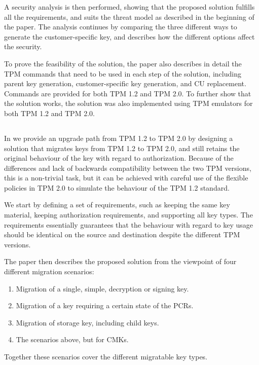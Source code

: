 A security analysis is then performed, showing that the proposed solution fulfills all the requirements, and suits the threat model as described in the beginning of the paper.
The analysis continues by comparing the three different ways to generate the customer-specific key, and describes how the different options affect the security.

To prove the feasibility of the solution, the paper also describes in detail the TPM commands that need to be used in each step of the solution, including parent key generation, customer-specific key generation, and CU replacement.
Commands are provided for both TPM 1.2 and TPM 2.0.
To further show that the solution works, the solution was also implemented using TPM emulators for both TPM 1.2 and TPM 2.0.

\subsection{\paperIItitle}

In  we provide an upgrade path from TPM 1.2 to TPM 2.0 by designing a solution that migrates keys from TPM 1.2 to TPM 2.0, and still retains the original behaviour of the key with regard to authorization.
Because of the differences and lack of backwards compatibility between the two TPM versions, this is a non-trivial task, but it can be achieved with careful use of the flexible policies in TPM 2.0 to simulate the behaviour of the TPM 1.2 standard.

We start by defining a set of requirements, such as keeping the same key material, keeping authorization requirements, and supporting all key types.
The requirements essentially guarantees that the behaviour with regard to key usage should be identical on the source and destination despite the different TPM versions.

The paper then describes the proposed solution from the viewpoint of four different migration scenarios:
\begin{enumerate}
	\item Migration of a single, simple, decryption or signing key.
	\item Migration of a key requiring a certain state of the PCRs.
	\item Migration of storage key, including child keys.
	\item The scenarios above, but for CMKs.
\end{enumerate}
Together these scenarios cover the different migratable key types.

